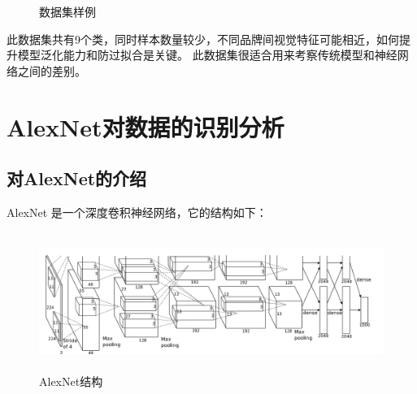 \documentclass[UTF8]{ctexart}
\begin{document}
\begin{figure}[H]
    \centering
{}\quad
{}\quad
{}\quad
{}\quad
 
\caption{数据集样例}
\label{数据集样例}
\end{figure}

此数据集共有9个类，同时样本数量较少，不同品牌间视觉特征可能相近，如何提升模型泛化能力和防过拟合是关键。
此数据集很适合用来考察传统模型和神经网络之间的差别。

\section{AlexNet对数据的识别分析}
\subsection{对AlexNet的介绍}
AlexNet 是一个深度卷积神经网络，它的结构如下：\cite{AlexNet}

\begin{figure}[H]
    \centering %
    \includegraphics[height=4.5cm]{../AlexNet/AlexNet_arc.png}
    \caption{AlexNet结构}
\end{figure}
\end{document}
